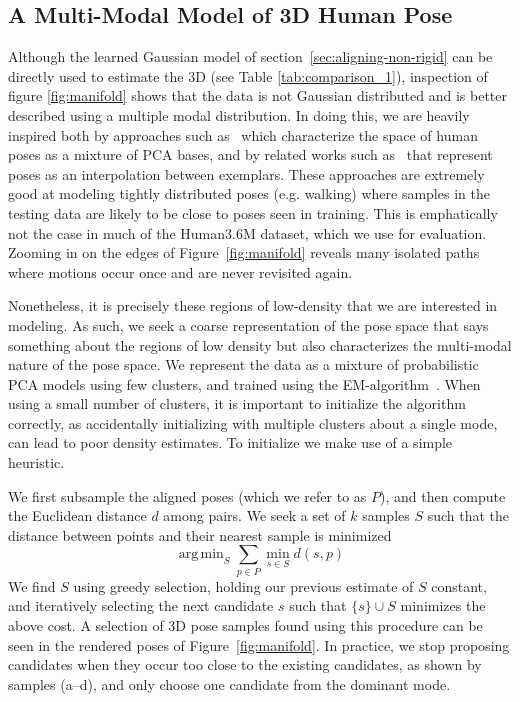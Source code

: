 \documentclass[10pt,twocolumn,letterpaper]{article}
\DeclareMathOperator*{\argmin}{arg\,min}
\begin{document}
\subsection{A Multi-Modal Model of 3D Human Pose}
\label{sec:learn-align}
Although the learned Gaussian model of
section~\ref{sec:aligning-non-rigid} can be directly used to estimate the 3D
(see Table \ref{tab:comparison_1}), inspection of figure
\ref{fig:manifold} shows that the data is not Gaussian distributed and
is better described using a multiple modal distribution. In doing
this, we are heavily inspired both by approaches such
as~\cite{pitelis2013learning} which characterize the space of human
poses as a mixture of PCA bases, and by related works such
as~\cite{wang2014representing,bregler2000recovering} that represent
poses as an interpolation between exemplars. These approaches are
extremely good at modeling tightly distributed poses (e.g. walking)
where samples in the testing data are likely to be close to poses seen
in training.  This is emphatically not the case in much of the
Human3.6M dataset, which we use for evaluation. Zooming in on the
edges of Figure~\ref{fig:manifold} reveals many isolated paths where
motions occur once and are never revisited again.

Nonetheless, it is precisely these regions of low-density that we are
interested in modeling. As such, we seek a coarse representation of
the pose space that says something about the regions of low density
but also characterizes the multi-modal nature of the pose space.  We
 represent the  data as a mixture of probabilistic PCA models
using few clusters, and trained using the
EM-algorithm~\cite{Tipping99probabilisticprincipal}. When using a
small number of clusters, it is important to initialize the algorithm
correctly, as accidentally initializing with multiple clusters about a
single mode, can lead to poor density estimates. To initialize we make use of a simple heuristic.

We first subsample the aligned poses (which we refer to as $P$), and
then compute the Euclidean distance $d$ among pairs.  We seek a set
of $k$ samples $S$ such that the distance between points and their
nearest sample is minimized
\begin{equation}
\argmin_S \sum_{p\in P} \min_{s\in S} d(s,p)
\label{eq:select}
\end{equation}
We find $S$ using greedy selection, holding our previous estimate of
$S$ constant, and iteratively selecting the next candidate $s$ such
that $\{s\}\cup S$ minimizes the above cost. A selection of 3D pose
samples found using this procedure can be seen in the rendered poses
of Figure~\ref{fig:manifold}. In practice, we stop proposing
candidates when they occur too close to the existing candidates, as
shown by samples (a--d), and only choose one candidate from the
dominant mode.
\end{document}

